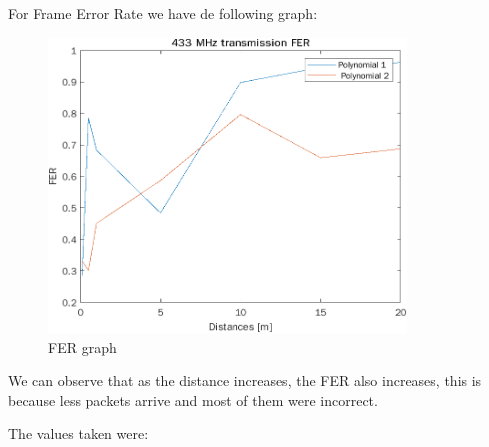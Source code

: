 
For Frame Error Rate we have de following graph:
\begin{figure}[!htbp]
	\centering
	\includegraphics [width=9.5cm]{images/FERt.png}
	\caption{FER graph}
\end{figure} 

We can observe that as the distance increases, the FER also increases, this is because less packets arrive and most of them were incorrect.

The values taken were:


	\begin{table} [!htbp]
		\centering
		\caption{FER values}
	\end{table}

